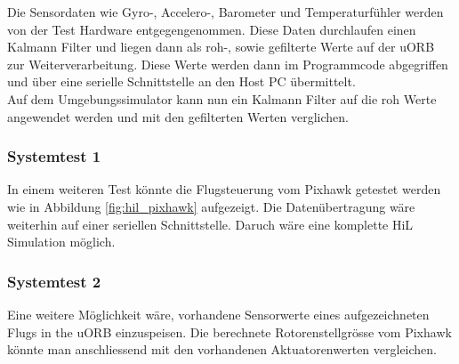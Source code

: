 \noindent Die Sensordaten wie Gyro-, Accelero-, Barometer und Temperaturfühler werden von der Test Hardware entgegengenommen. Diese Daten durchlaufen einen Kalmann Filter und liegen dann als roh-, sowie gefilterte Werte auf der uORB zur Weiterverarbeitung. Diese Werte werden dann im Programmcode abgegriffen und über eine serielle Schnittstelle an den Host PC übermittelt.\\
Auf dem Umgebungssimulator kann nun ein Kalmann Filter auf die roh Werte angewendet werden und mit den gefilterten Werten verglichen.



\subsubsection{Systemtest 1}
In einem weiteren Test könnte die Flugsteuerung vom Pixhawk getestet werden wie in Abbildung \ref{fig:hil_pixhawk} aufgezeigt. Die Datenübertragung wäre weiterhin auf einer seriellen Schnittstelle. Daruch wäre eine komplette HiL Simulation möglich.

\subsubsection{Systemtest 2}
Eine weitere Möglichkeit wäre, vorhandene Sensorwerte eines aufgezeichneten Flugs in the uORB einzuspeisen. Die berechnete Rotorenstellgrösse vom Pixhawk könnte man anschliessend mit den vorhandenen Aktuatorenwerten vergleichen.
\clearpage